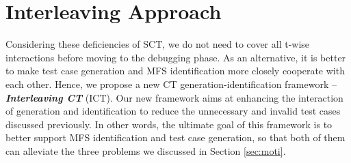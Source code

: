 \documentclass[10pt,journal,compsoc]{IEEEtran}
\begin{document}
\section{Interleaving Approach}\label{sec:app}

Considering these deficiencies of SCT, we do not need to cover all t-wise interactions before moving to the debugging phase. As an alternative, it is better to make test case generation and MFS identification more closely cooperate with each other. Hence, we propose a new CT generation-identification framework -- \emph{\textbf{Interleaving CT}} (ICT). Our new framework aims at enhancing the interaction of generation and identification to reduce the unnecessary and invalid test cases discussed previously. In other words, the ultimate goal of this framework is to better support MFS identification and test case generation, so that both of them can alleviate the three problems we discussed in Section \ref{sec:moti}.
\end{document}
